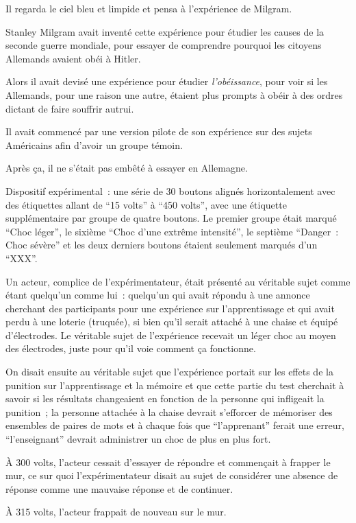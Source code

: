 Il regarda le ciel bleu et limpide et pensa à l'expérience de Milgram.

Stanley Milgram avait inventé cette expérience pour étudier les causes de la seconde guerre mondiale, pour essayer de comprendre pourquoi les citoyens Allemands avaient obéi à Hitler.

Alors il avait devisé une expérience pour étudier \emph{l'obéissance}, pour voir si les Allemands, pour une raison une autre, étaient plus prompts à obéir à des ordres dictant de faire souffrir autrui.

Il avait commencé par une version pilote de son expérience sur des sujets Américains afin d'avoir un groupe témoin.

Après ça, il ne s'était pas embêté à essayer en Allemagne.

Dispositif expérimental~: une série de 30 boutons alignés horizontalement avec des étiquettes allant de “15 volts” à “450 volts”, avec une étiquette supplémentaire par groupe de quatre boutons. Le premier groupe était marqué “Choc léger”, le sixième “Choc d'une extrême intensité”, le septième “Danger~: Choc sévère” et les deux derniers boutons étaient seulement marqués d'un “XXX”.

Un acteur, complice de l'expérimentateur, était présenté au véritable sujet comme étant quelqu'un comme lui~: quelqu'un qui avait répondu à une annonce cherchant des participants pour une expérience sur l'apprentissage et qui avait perdu à une loterie (truquée), si bien qu'il serait attaché à une chaise et équipé d'électrodes. Le véritable sujet de l'expérience recevait un léger choc au moyen des électrodes, juste pour qu'il voie comment ça fonctionne.

On disait ensuite au véritable sujet que l'expérience portait sur les effets de la punition sur l'apprentissage et la mémoire et que cette partie du test cherchait à savoir si les résultats changeaient en fonction de la personne qui infligeait la punition~; la personne attachée à la chaise devrait s'efforcer de mémoriser des ensembles de paires de mots et à chaque fois que “l'apprenant” ferait une erreur, “l'enseignant” devrait administrer un choc de plus en plus fort.

À 300 volts, l'acteur cessait d'essayer de répondre et commençait à frapper le mur, ce sur quoi l'expérimentateur disait au sujet de considérer une absence de réponse comme une mauvaise réponse et de continuer.

À 315 volts, l'acteur frappait de nouveau sur le mur.

